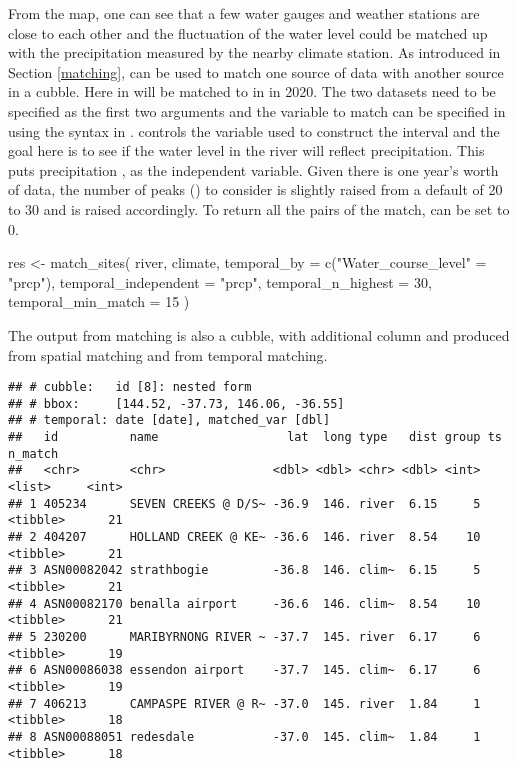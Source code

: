 \documentclass{article}
\newenvironment{Shaded}{\begin{snugshade}}{\end{snugshade}}
\newcommand{\AttributeTok}[1]{\textcolor[rgb]{0.77,0.63,0.00}{#1}}
\newcommand{\DecValTok}[1]{\textcolor[rgb]{0.00,0.00,0.81}{#1}}
\newcommand{\FunctionTok}[1]{\textcolor[rgb]{0.00,0.00,0.00}{#1}}
\newcommand{\NormalTok}[1]{#1}
\newcommand{\OtherTok}[1]{\textcolor[rgb]{0.56,0.35,0.01}{#1}}
\newcommand{\StringTok}[1]{\textcolor[rgb]{0.31,0.60,0.02}{#1}}
\begin{document}
From the map, one can see that a few water gauges and weather stations are close to each other and the fluctuation of the water level could be matched up with the precipitation measured by the nearby climate station. As introduced in Section \ref{matching},  can be used to match one source of data with another source in a cubble. Here  in  will be matched to  in  in 2020. The two datasets need to be specified as the first two arguments and the variable to match can be specified in  using the  syntax in .  controls the variable used to construct the interval and the goal here is to see if the water level in the river will reflect precipitation. This puts precipitation , as the independent variable. Given there is one year's worth of data, the number of peaks () to consider is slightly raised from a default of 20 to 30 and  is raised accordingly. To return all the pairs of the match,  can be set to 0.

\begin{Shaded}
\begin{Highlighting}[]
\NormalTok{res }\OtherTok{\textless{}{-}} \FunctionTok{match\_sites}\NormalTok{(}
\NormalTok{  river, climate,}
  \AttributeTok{temporal\_by =} \FunctionTok{c}\NormalTok{(}\StringTok{"Water\_course\_level"} \OtherTok{=} \StringTok{"prcp"}\NormalTok{),}
  \AttributeTok{temporal\_independent =} \StringTok{"prcp"}\NormalTok{,  }
  \AttributeTok{temporal\_n\_highest =} \DecValTok{30}\NormalTok{,}
  \AttributeTok{temporal\_min\_match =} \DecValTok{15}
\NormalTok{)}
\end{Highlighting}
\end{Shaded}

The output from matching is also a cubble, with additional column  and  produced from spatial matching and  from temporal matching.

\begin{verbatim}
## # cubble:   id [8]: nested form
## # bbox:     [144.52, -37.73, 146.06, -36.55]
## # temporal: date [date], matched_var [dbl]
##   id          name                  lat  long type   dist group ts       n_match
##   <chr>       <chr>               <dbl> <dbl> <chr> <dbl> <int> <list>     <int>
## 1 405234      SEVEN CREEKS @ D/S~ -36.9  146. river  6.15     5 <tibble>      21
## 2 404207      HOLLAND CREEK @ KE~ -36.6  146. river  8.54    10 <tibble>      21
## 3 ASN00082042 strathbogie         -36.8  146. clim~  6.15     5 <tibble>      21
## 4 ASN00082170 benalla airport     -36.6  146. clim~  8.54    10 <tibble>      21
## 5 230200      MARIBYRNONG RIVER ~ -37.7  145. river  6.17     6 <tibble>      19
## 6 ASN00086038 essendon airport    -37.7  145. clim~  6.17     6 <tibble>      19
## 7 406213      CAMPASPE RIVER @ R~ -37.0  145. river  1.84     1 <tibble>      18
## 8 ASN00088051 redesdale           -37.0  145. clim~  1.84     1 <tibble>      18
\end{verbatim}
\end{document}
